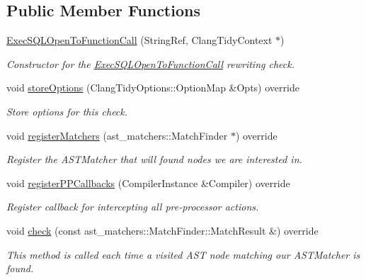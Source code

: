 \subsection*{Public Member Functions}
\begin{DoxyCompactItemize}
\item 
\hyperlink{classclang_1_1tidy_1_1pagesjaunes_1_1_exec_s_q_l_open_to_function_call_acea024dc1151ac348418c1fb5d4e65b0}{Exec\+S\+Q\+L\+Open\+To\+Function\+Call} (String\+Ref, Clang\+Tidy\+Context $\ast$)
\begin{DoxyCompactList}\small\item\em Constructor for the \hyperlink{classclang_1_1tidy_1_1pagesjaunes_1_1_exec_s_q_l_open_to_function_call}{Exec\+S\+Q\+L\+Open\+To\+Function\+Call} rewriting check. \end{DoxyCompactList}\item 
void \hyperlink{classclang_1_1tidy_1_1pagesjaunes_1_1_exec_s_q_l_open_to_function_call_a55b576bd9764d3756ec7a10340a2c339}{store\+Options} (Clang\+Tidy\+Options\+::\+Option\+Map \&Opts) override
\begin{DoxyCompactList}\small\item\em Store options for this check. \end{DoxyCompactList}\item 
void \hyperlink{classclang_1_1tidy_1_1pagesjaunes_1_1_exec_s_q_l_open_to_function_call_a873f655e036659f80ff9478510e0e556}{register\+Matchers} (ast\+\_\+matchers\+::\+Match\+Finder $\ast$) override
\begin{DoxyCompactList}\small\item\em Register the A\+S\+T\+Matcher that will found nodes we are interested in. \end{DoxyCompactList}\item 
void \hyperlink{classclang_1_1tidy_1_1pagesjaunes_1_1_exec_s_q_l_open_to_function_call_a85a5f5ed46dfa97a2cf12e5af10c1591}{register\+P\+P\+Callbacks} (Compiler\+Instance \&Compiler) override
\begin{DoxyCompactList}\small\item\em Register callback for intercepting all pre-\/processor actions. \end{DoxyCompactList}\item 
void \hyperlink{classclang_1_1tidy_1_1pagesjaunes_1_1_exec_s_q_l_open_to_function_call_ad459a073a4ef5dfcba189e46f618902d}{check} (const ast\+\_\+matchers\+::\+Match\+Finder\+::\+Match\+Result \&) override
\begin{DoxyCompactList}\small\item\em This method is called each time a visited A\+ST node matching our A\+S\+T\+Matcher is found. \end{DoxyCompactList}\item 

\end{DoxyCompactItemize}
